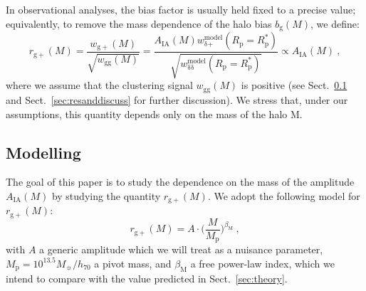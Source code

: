 \documentclass[a4paper,fleqn,usenatbib]{mnras}
\begin{document}
In observational analyses, the bias factor is usually held fixed to a precise value; equivalently, to remove the mass dependence of the halo bias $b_{\mathrm{g}} (M)$, we define:
\begin{equation}
    r_{\mathrm{g+}} (M)=\frac{w_{\mathrm{g+}} (M)}{\sqrt{w_{\mathrm{gg}} (M)}} =\frac{A_{\mathrm{IA}} (M) w_{\mathrm{\delta} \mathrm{+}}^{\mathrm{model}} (R_{\mathrm{p}} = R_{\mathrm{p}}^*) }{\sqrt{w_{\mathrm{\delta} \mathrm{\delta}}^{\mathrm{model}} (R_{\mathrm{p}}=R_{\mathrm{p}}^*)}} \propto A_{\mathrm{IA}} (M) \ ,
	\label{eq:rg+}
\end{equation}
where we assume that the clustering signal $w_{\mathrm{gg}}(M)$ is positive (see Sect.~\ref{subsec:modelling} and Sect.~\ref{sec:resanddiscuss} for further discussion). We stress that, under our assumptions, this quantity depends only on the mass of the halo M.

\subsection{Modelling}
\label{subsec:modelling}
The goal of this paper is to study the dependence on the mass of the amplitude $A_{\mathrm{IA}} (M)$ by studying the quantity $r_{\mathrm{g+}} (M)$.
We adopt the following model for $r_{\mathrm{g+}} (M)$:
\begin{equation}
    r_{\mathrm{g+}} (M) = A \cdot  \biggl ( \frac{M}{M_{\mathrm{p}}} \biggl )^{\beta_{\mathrm{M}}} \ ,
	\label{eq:modelrg+}
\end{equation}
with $A$ a generic amplitude which we will treat as a nuisance parameter, $M_{\mathrm{p}} = 10^{13.5} M_{\sun}/h_{70}$ a pivot mass, and $\beta_{\mathrm{M}}$ a free power-law index, which we intend to compare with the value predicted in Sect.~\ref{sec:theory}.
\end{document}
